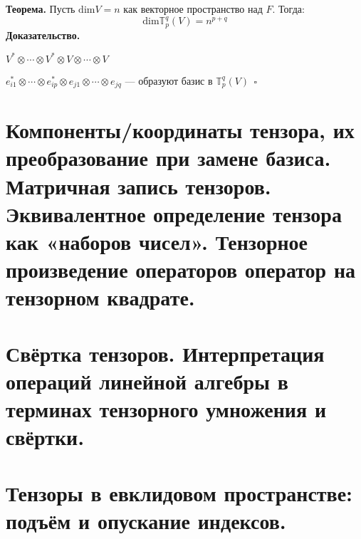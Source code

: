 \documentclass[12pt]{article}
\begin{document}
\textbf{Теорема.} Пусть $\mathrm{dim}V=n$ как векторное пространство над $F$. Тогда:
$$\mathrm{dim}\mathbb{T}_p^q(V)=n^{p+q}$$
\textbf{Доказательство.}

$V^* \otimes \cdots \otimes V^* \otimes V \otimes \cdots \otimes V$

$e_{i1}^* \otimes \cdots \otimes e_{ip}^* \otimes e_{j1} \otimes \cdots \otimes e_{jq}$ — образуют базис в $\mathbb{T}_p^q(V) \ \ \square$

\section{Компоненты/координаты тензора, их преобразование при замене базиса. Матричная запись тензоров. Эквивалентное определение тензора как «наборов чисел». Тензорное произведение операторов оператор на тензорном квадрате.}

\section{Свёртка тензоров. Интерпретация операций линейной алгебры в терминах тензорного умножения и свёртки.}

\section{Тензоры в евклидовом пространстве: подъём и опускание индексов.}
\end{document}

